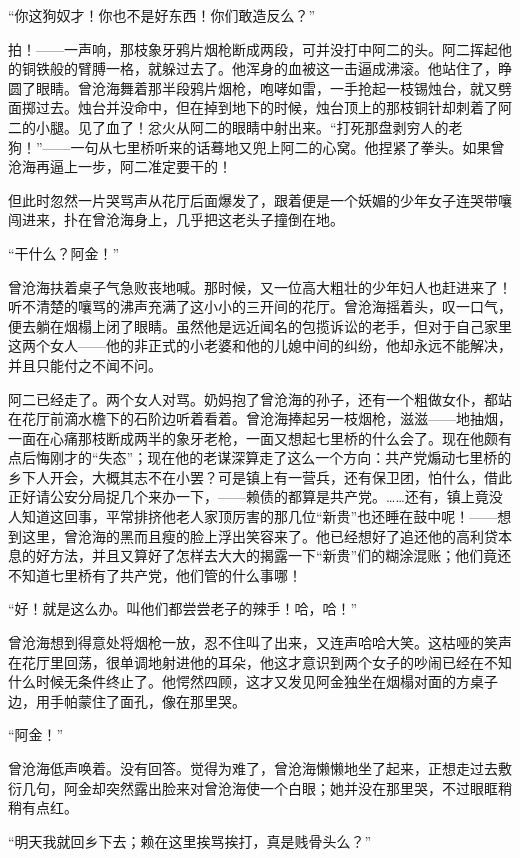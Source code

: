 \par “你这狗奴才！你也不是好东西！你们敢造反么？”
\par 拍！——一声响，那枝象牙鸦片烟枪断成两段，可并没打中阿二的头。阿二挥起他的铜铁般的臂膊一格，就躲过去了。他浑身的血被这一击逼成沸滚。他站住了，睁圆了眼睛。曾沧海舞着那半段鸦片烟枪，咆哮如雷，一手抢起一枝锡烛台，就又劈面掷过去。烛台并没命中，但在掉到地下的时候，烛台顶上的那枝铜针却刺着了阿二的小腿。见了血了！忿火从阿二的眼睛中射出来。“打死那盘剥穷人的老狗！”——一句从七里桥听来的话蓦地又兜上阿二的心窝。他捏紧了拳头。如果曾沧海再逼上一步，阿二准定要干的！
\par 但此时忽然一片哭骂声从花厅后面爆发了，跟着便是一个妖媚的少年女子连哭带嚷闯进来，扑在曾沧海身上，几乎把这老头子撞倒在地。
\par “干什么？阿金！”
\par 曾沧海扶着桌子气急败丧地喊。那时候，又一位高大粗壮的少年妇人也赶进来了！听不清楚的嚷骂的沸声充满了这小小的三开间的花厅。曾沧海摇着头，叹一口气，便去躺在烟榻上闭了眼睛。虽然他是远近闻名的包揽诉讼的老手，但对于自己家里这两个女人——他的非正式的小老婆和他的儿媳中间的纠纷，他却永远不能解决，并且只能付之不闻不问。
\par 阿二已经走了。两个女人对骂。奶妈抱了曾沧海的孙子，还有一个粗做女仆，都站在花厅前滴水檐下的石阶边听着看着。曾沧海捧起另一枝烟枪，滋滋——地抽烟，一面在心痛那枝断成两半的象牙老枪，一面又想起七里桥的什么会了。现在他颇有点后悔刚才的“失态”；现在他的老谋深算走了这么一个方向：共产党煽动七里桥的乡下人开会，大概其志不在小罢？可是镇上有一营兵，还有保卫团，怕什么，借此正好请公安分局捉几个来办一下，——赖债的都算是共产党。……还有，镇上竟没人知道这回事，平常排挤他老人家顶厉害的那几位“新贵”也还睡在鼓中呢！——想到这里，曾沧海的黑而且瘦的脸上浮出笑容来了。他已经想好了追还他的高利贷本息的好方法，并且又算好了怎样去大大的揭露一下“新贵”们的糊涂混账；他们竟还不知道七里桥有了共产党，他们管的什么事哪！
\par “好！就是这么办。叫他们都尝尝老子的辣手！哈，哈！”
\par 曾沧海想到得意处将烟枪一放，忍不住叫了出来，又连声哈哈大笑。这枯哑的笑声在花厅里回荡，很单调地射进他的耳朵，他这才意识到两个女子的吵闹已经在不知什么时候无条件终止了。他愕然四顾，这才又发见阿金独坐在烟榻对面的方桌子边，用手帕蒙住了面孔，像在那里哭。
\par “阿金！”
\par 曾沧海低声唤着。没有回答。觉得为难了，曾沧海懒懒地坐了起来，正想走过去敷衍几句，阿金却突然露出脸来对曾沧海使一个白眼；她并没在那里哭，不过眼眶稍稍有点红。
\par “明天我就回乡下去；赖在这里挨骂挨打，真是贱骨头么？”
